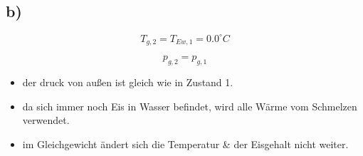 

\subsection*{b)}

\[
T_{g,2} = T_{Ew,1} = 0.0^\circ C
\]

\[
p_{g,2} = p_{g,1}
\]

\begin{itemize}
    \item der druck von außen ist gleich wie in Zustand 1.
    \item da sich immer noch Eis in Wasser befindet, wird alle Wärme vom Schmelzen verwendet.
    \item im Gleichgewicht ändert sich die Temperatur \& der Eisgehalt nicht weiter.
\end{itemize}